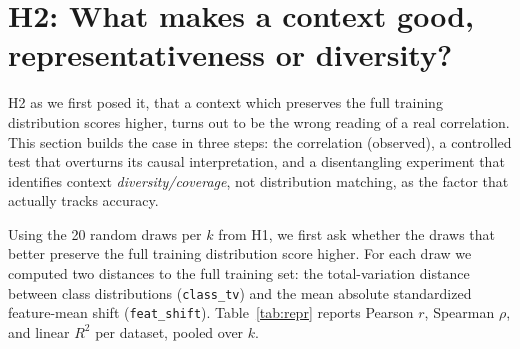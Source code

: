 \documentclass[11pt,a4paper]{article}
\begin{document}
\section{H2: What makes a context good, representativeness or diversity?}

H2 as we first posed it, that a context which preserves the full training
distribution scores higher, turns out to be the wrong reading of a real
correlation. This section builds the case in three steps: the correlation
(observed), a controlled test that overturns its causal interpretation, and a
disentangling experiment that identifies context \emph{diversity/coverage}, not
distribution matching, as the factor that actually tracks accuracy.

Using the 20 random draws per $k$ from H1, we first ask whether the draws that
better preserve the full training distribution score higher. For each draw we
computed two distances to the full training set: the total-variation distance
between class distributions (\texttt{class\_tv}) and the mean absolute
standardized feature-mean shift (\texttt{feat\_shift}). Table~\ref{tab:repr}
reports Pearson $r$, Spearman $\rho$, and linear $R^2$ per dataset, pooled over
$k$.
\end{document}
